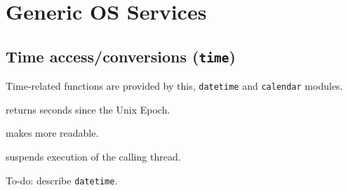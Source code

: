 \section{Generic OS Services}
\subsection{Time access/conversions (\texttt{time})}
Time-related functions are provided by this, \texttt{datetime} and \texttt{calendar} modules.

\begin{itemx}
	\item {} returns seconds since the Unix Epoch.

	\item {} makes  more readable.

	\item {} suspends execution of the calling thread.
\end{itemx}

To-do: describe \texttt{datetime}.